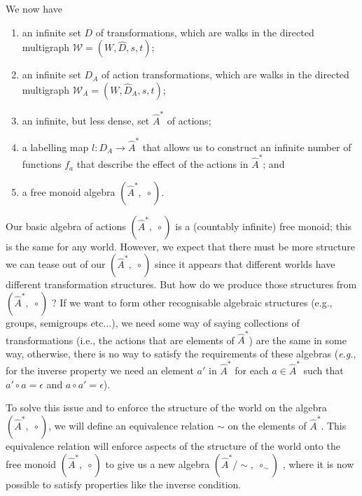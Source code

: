 We now have 
\begin{enumerate}[(1)]
	\item an infinite set $D$ of transformations, which are walks in the directed multigraph $\mathscr{W}=(W, \hat{D}, s, t)$;

	\item an infinite set $D_{A}$ of action transformations, which are walks in the directed multigraph $\mathscr{W}_{A}=(W, \hat{D}_{A}, s, t)$;

	\item an infinite, but less dense, set $\hat{A}^{\ast}$ of actions;

	\item a labelling map $l: D_{A} \to \hat{A}^{\ast}$ that allows us to construct an infinite number of functions $f_{a}$ that describe the effect of the actions in $\hat{A}^{\ast}$; and

    \item a free monoid algebra $(\hat{A}^{\ast}, \; \circ)$.
\end{enumerate}


Our basic algebra of actions $(\hat{A}^{\ast}, \; \circ)$ is a (countably infinite) free monoid; this is the same for any world.
However, we expect that there must be more structure we can tease out of our $(\hat{A}^{\ast}, \; \circ)$ since it appears that different worlds have different transformation structures.
But how do we produce those structures from $(\hat{A}^{\ast}, \; \circ)$ ?
If we want to form other recognisable algebraic structures (e.g., groups, semigroups etc...), we need some way of saying collections of transformations (i.e., the actions that are elements of $\hat{A}^{\ast}$) are the same in some way, otherwise, there is no way to satisfy the requirements of these algebras (\textit{e.g.}, for the inverse property we need an element $a'$ in $\hat{A}^{\ast}$ for each $a \in \hat{A}^{\ast}$ such that $a' \circ a = \epsilon$ and $a \circ a' = \epsilon$).

To solve this issue and to enforce the structure of the world on the algebra $(\hat{A}^{\ast}, \; \circ)$, we will define an equivalence relation $\sim$ on the elements of $\hat{A}^{\ast}$.
This equivalence relation will enforce aspects of the structure of the world onto the free monoid $(\hat{A}^{\ast}, \; \circ)$ to give us a new algebra $(\hat{A}^{\ast}/\sim, \; \circ_{\sim})$ , where it is now possible to satisfy properties like the inverse condition.


